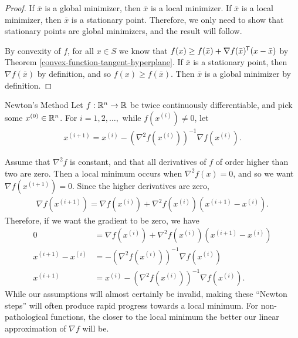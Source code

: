 \begin{proof}
    If $\bar{x}$ is a global minimizer, then $\bar{x}$ is a local minimizer. If $\bar{x}$ is a local minimizer, then $\bar{x}$ is a stationary point. Therefore, we only need to show that stationary points are global minimizers, and the result will follow.

    By convexity of $f$, for all $x \in S$ we know that $f(x) \geq f(\bar{x}) + \nabla f(\bar{x})^{\mkern-1.5mu\mathsf{T}}(x - \bar{x})$ by Theorem \ref{convex-function-tangent-hyperplane}. If $\bar{x}$ is a stationary point, then $\nabla f(\bar{x})$ by definition, and so $f(x) \geq f(\bar{x})$. Then $\bar{x}$ is a global minimizer by definition.
\end{proof}

\begin{defn}{Newton's Method}\label{newtons-method}
    Let $f: \mathbb{R}^n \to \mathbb{R}$ be twice continuously differentiable, and pick some $x^{(0)} \in \mathbb{R}^n$. For $i = 1, 2, \ldots, $ while $f(x^{(i)}) \neq 0$, let
    \begin{align*}
        x^{(i+1)} = x^{(i)} - \left(\nabla^2f(x^{(i)})\right)^{-1}\nabla f(x^{(i)}).
    \end{align*}
\end{defn}

\begin{rmk}
    Assume that $\nabla^2f$ is constant, and that all derivatives of $f$ of order higher than two are zero. Then a local minimum occurs when $\nabla^2f(x) = 0$, and so we want $\nabla f(x^{(i+1)}) = 0$. Since the higher derivatives are zero,
    \begin{align*}
        \nabla f(x^{(i+1)}) = \nabla f(x^{(i)}) + \nabla^2f(x^{(i)})(x^{(i+1)} - x^{(i)}).
    \end{align*}
    Therefore, if we want the gradient to be zero, we have
    \begin{align*}
        0 &= \nabla f(x^{(i)}) + \nabla^2f(x^{(i)})(x^{(i+1)} - x^{(i)}) \\
        x^{(i+1)} - x^{(i)} &= -\left(\nabla^2f(x^{(i)})\right)^{-1}\nabla f(x^{(i)}) \\
        x^{(i+1)} &= x^{(i)} - \left(\nabla^2f(x^{(i)})\right)^{-1}\nabla f(x^{(i)}).
    \end{align*}
    While our assumptions will almost certainly be invalid, making these ``Newton steps'' will often produce rapid progress towards a local minimum. For non-pathological functions, the closer to the local minimum the better our linear approximation of $\nabla f$ will be.
\end{rmk}

